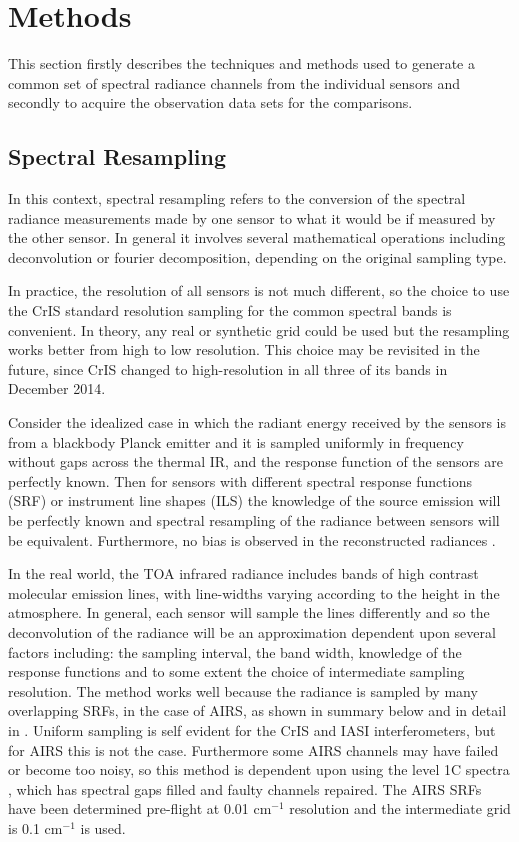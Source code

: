 \documentclass[twocolumn,10pt]{article}
\begin{document}
\section{Methods}
\label{sec:orgheadline6}

This section firstly describes the techniques and methods used to generate a common set of spectral radiance channels from the individual sensors and secondly to acquire the observation data sets for the comparisons. 

\subsection{Spectral Resampling}
\label{sec:orgheadline4}

In this context, spectral resampling refers to the conversion of the spectral radiance measurements made by one sensor to what it would be if measured by the other sensor. In general it involves several mathematical operations including deconvolution or fourier decomposition, depending on the original sampling type.

In practice, the resolution of all sensors is not much different, so the choice to use the CrIS standard resolution sampling for the common spectral bands is convenient. In theory, any real or synthetic grid could be used but the resampling works better from high to low resolution. This choice may be revisited in the future, since CrIS changed to high-resolution in all three of its bands in December 2014.

Consider the idealized case in which the radiant energy received by the sensors is from a blackbody Planck emitter and it is sampled uniformly in frequency without gaps across the thermal IR, and the response function of the sensors are perfectly known. Then for sensors with different spectral response functions (SRF) or instrument line shapes (ILS) the knowledge of the source emission will be perfectly known and spectral resampling of the radiance between sensors will be equivalent. Furthermore, no bias is observed in the reconstructed radiances \cite{Motteler2017b}. 

In the real world, the TOA infrared radiance includes bands of high contrast molecular emission lines, with line-widths varying according to the height in the atmosphere. In general, each sensor will sample the lines differently and so the deconvolution of the radiance will be an approximation dependent upon several factors including: the sampling interval, the band width, knowledge of the response functions and to some extent the choice of intermediate sampling resolution. The method works well because the radiance is sampled by many overlapping SRFs, in the case of AIRS, as shown in summary below and in detail in \cite{Motteler2017a}. Uniform sampling is self evident for the CrIS and IASI interferometers, but for AIRS this is not the case. Furthermore some AIRS channels may have failed or become too noisy, so this method is dependent upon using the level 1C spectra \cite{Manning2015}, which has spectral gaps filled and faulty channels repaired. The AIRS SRFs have been determined pre-flight at 0.01 cm$^{-1}$ resolution and the intermediate grid is 0.1 cm$^{-1}$ is used.
\end{document}
